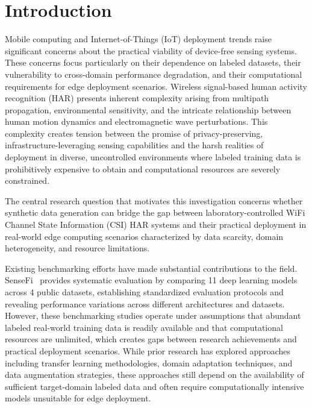 \documentclass[journal]{IEEEtran}
\begin{document}
\section{Introduction}

Mobile computing and Internet-of-Things (IoT) deployment trends raise significant concerns about the practical viability of device-free sensing systems. These concerns focus particularly on their dependence on labeled datasets, their vulnerability to cross-domain performance degradation, and their computational requirements for edge deployment scenarios. Wireless signal-based human activity recognition (HAR) presents inherent complexity arising from multipath propagation, environmental sensitivity, and the intricate relationship between human motion dynamics and electromagnetic wave perturbations. This complexity creates tension between the promise of privacy-preserving, infrastructure-leveraging sensing capabilities and the harsh realities of deployment in diverse, uncontrolled environments where labeled training data is prohibitively expensive to obtain and computational resources are severely constrained.

The central research question that motivates this investigation concerns whether synthetic data generation can bridge the gap between laboratory-controlled WiFi Channel State Information (CSI) HAR systems and their practical deployment in real-world edge computing scenarios characterized by data scarcity, domain heterogeneity, and resource limitations.

Existing benchmarking efforts have made substantial contributions to the field. SenseFi~\cite{yang2023sensefi} provides systematic evaluation by comparing 11 deep learning models across 4 public datasets, establishing standardized evaluation protocols and revealing performance variations across different architectures and datasets. However, these benchmarking studies operate under assumptions that abundant labeled real-world training data is readily available and that computational resources are unlimited, which creates gaps between research achievements and practical deployment scenarios. While prior research has explored approaches including transfer learning methodologies, domain adaptation techniques, and data augmentation strategies, these approaches still depend on the availability of sufficient target-domain labeled data and often require computationally intensive models unsuitable for edge deployment.
\end{document}
